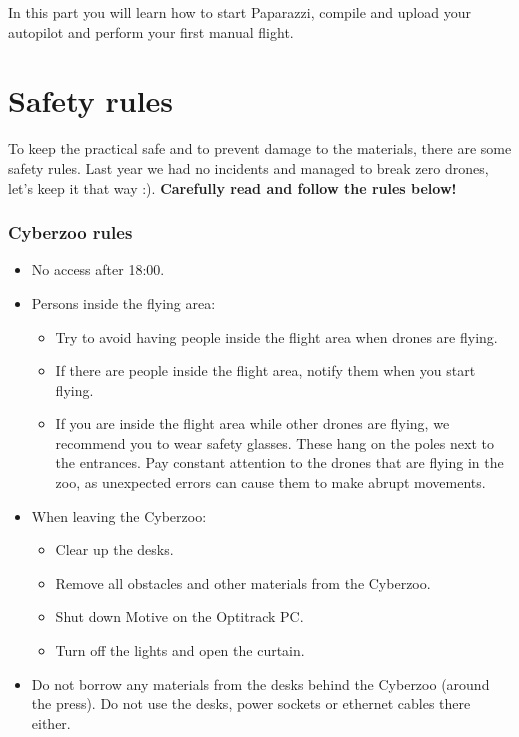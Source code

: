 \documentclass{article}
\begin{document}

In this part you will learn how to start Paparazzi, compile and upload your autopilot and perform your first manual flight.

\section{Safety rules}
To keep the practical safe and to prevent damage to the materials, there are some safety rules.
Last year we had no incidents and managed to break zero drones, let's keep it that way :).
\textbf{Carefully read and follow the rules below!}

\subsubsection*{Cyberzoo rules}
\begin{itemize}
\item No access after 18:00.
\item Persons inside the flying area:
\begin{itemize}
\item Try to avoid having people inside the flight area when drones are flying.
\item If there are people inside the flight area, notify them when you start flying.
\item If you are inside the flight area while other drones are flying, we recommend you to wear safety glasses. These hang on the poles next to the entrances. Pay constant attention to the drones that are flying in the zoo, as unexpected errors can cause them to make abrupt movements.
\end{itemize}
\item When leaving the Cyberzoo:
\begin{itemize}
\item Clear up the desks.
\item Remove all obstacles and other materials from the Cyberzoo.
\item Shut down Motive on the Optitrack PC.
\item Turn off the lights and open the curtain.
\end{itemize}
\item Do not borrow any materials from the desks behind the Cyberzoo (around the press). Do not use the desks, power sockets or ethernet cables there either.
\end{itemize}
\end{document}
